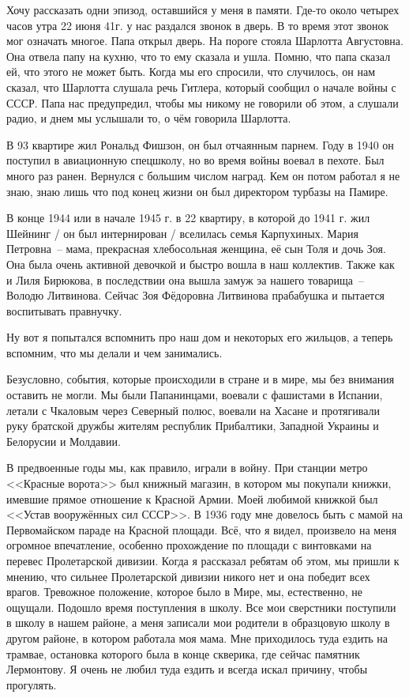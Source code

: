 Хочу рассказать одни эпизод, оставшийся у меня в памяти. Где-то около четырех часов утра 22 июня 41г. у нас раздался звонок в дверь. В то время этот звонок мог означать многое. Папа открыл дверь. На пороге стояла Шарлотта Августовна. Она отвела папу на кухню, что то ему сказала и ушла. Помню, что папа сказал ей, что этого не может быть. Когда мы его спросили, что случилось, он нам сказал, что Шарлотта слушала речь Гитлера, который сообщил о начале войны с СССР. Папа нас предупредил, чтобы мы никому не говорили об этом, а слушали радио, и днем мы услышали то, о чём говорила Шарлотта.

В 93 квартире жил Рональд Фишзон, он был отчаянным парнем. Году в 1940 он поступил в авиационную спецшколу, но во время войны воевал в пехоте. Был много раз ранен. Вернулся с большим числом наград. Кем он потом работал я не знаю, знаю лишь что под конец жизни он был директором турбазы на Памире.

В конце 1944 или в начале 1945 г. в 22 квартиру, в которой до 1941 г. жил Шейнинг / он был интернирован / вселилась семья Карпухиных. Мария Петровна~-- мама, прекрасная хлебосольная женщина, её сын Толя и дочь Зоя. Она была очень активной девочкой и быстро вошла в наш коллектив. Также как и Лиля Бирюкова, в последствии она вышла замуж эа нашего товарища~-- Володю Литвинова. Сейчас Зоя Фёдоровна Литвинова прабабушка и пытается воспитывать правнучку.

Ну вот я попытался вспомнить про наш дом и некоторых его жильцов, а теперь вспомним, что мы делали и чем занимались.

Безусловно, события, которые происходили в стране и в мире, мы без внимания оставить не могли. Мы были Папанинцами, воевали с фашистами в Испании, летали с Чкаловым через Северный полюс, воевали на Хасане и протягивали руку братской дружбы жителям республик Прибалтики, Западной Украины и Белорусии и Молдавии.

В предвоенные годы мы, как правило, играли в войну. При станции метро <<Красные ворота>> был книжный магазин, в котором мы покупали книжки, имевшие прямое отношение к Красной Армии. Моей любимой книжкой был <<Устав вооружённых сил СССР>>. В 1936 году мне довелось быть с мамой на Первомайском параде на Красной площади. Всё, что я видел, произвело на меня огромное впечатление, особенно прохождение по площади с винтовками на перевес Пролетарской дивизии. Когда я рассказал ребятам об этом, мы пришли к мнению, что сильнее Пролетарской дивизии никого нет и она победит всех врагов. Тревожное положение, которое было в Мире, мы, естественно, не ощущали. Подошло время поступления в школу. Все мои сверстники поступили в школу в нашем районе, а меня записали мои родители в образцовую школу в другом районе, в котором работала моя мама. Мне приходилось туда ездить на трамвае, остановка которого была в конце скверика, где сейчас памятник Лермонтову. Я очень не любил туда ездить и всегда искал причину, чтобы прогулять.

